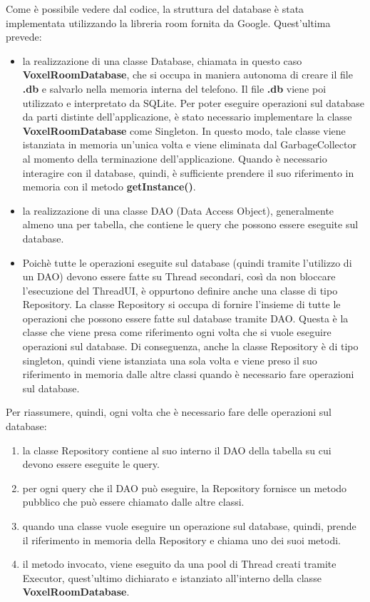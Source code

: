 \documentclass{article}
\begin{document}
Come è possibile vedere dal codice, la struttura del database è stata implementata utilizzando la libreria room fornita da Google.
Quest'ultima prevede:
\begin{itemize}
    \itemsep 0em 
    \item la realizzazione di una classe Database, chiamata in questo caso \textbf{VoxelRoomDatabase}, che si occupa in maniera autonoma di creare
    il file \textbf{.db} e salvarlo nella memoria interna del telefono. Il file \textbf{.db} viene poi utilizzato e interpretato da SQLite. Per poter
    eseguire operazioni sul database da parti distinte dell'applicazione, è stato necessario implementare la classe \textbf{VoxelRoomDatabase} come
    Singleton. In questo modo, tale classe viene istanziata in memoria un'unica volta e viene eliminata dal GarbageCollector al momento della terminazione
    dell'applicazione. Quando è necessario interagire con il database, quindi, è sufficiente prendere il suo riferimento in memoria con il metodo \textbf{getInstance()}. 
    \item la realizzazione di una classe DAO (Data Access Object), generalmente almeno una per tabella, che contiene le query che possono essere eseguite 
    sul database.
    \item Poichè tutte le operazioni eseguite sul database (quindi tramite l'utilizzo di un DAO) devono essere fatte su Thread secondari, così da
    non bloccare l'esecuzione del ThreadUI, è oppurtono definire anche una classe di tipo Repository. La classe Repository si occupa di fornire l'insieme
    di tutte le operazioni che possono essere fatte sul database tramite DAO. Questa è la classe che viene presa come riferimento ogni volta che si vuole
    eseguire operazioni sul database. Di conseguenza, anche la classe Repository è di tipo singleton, quindi viene istanziata una sola volta e viene preso 
    il suo riferimento in memoria dalle altre classi quando è necessario fare operazioni sul database.    
\end{itemize} 

Per riassumere, quindi, ogni volta che è necessario fare delle operazioni sul database:

\begin{enumerate}
    \itemsep 0em 
    \item la classe Repository contiene al suo interno il DAO della tabella su cui devono essere eseguite le query. 
    \item per ogni query che il DAO può eseguire, la Repository fornisce un metodo pubblico che può essere chiamato dalle altre classi.
    \item quando una classe vuole eseguire un operazione sul database, quindi, prende il riferimento in memoria della Repository e chiama
    uno dei suoi metodi.
    \item il metodo invocato, viene eseguito da una pool di Thread creati tramite Executor, quest'ultimo dichiarato e istanziato all'interno della classe \textbf{VoxelRoomDatabase}. 
\end{enumerate}
\end{document}
